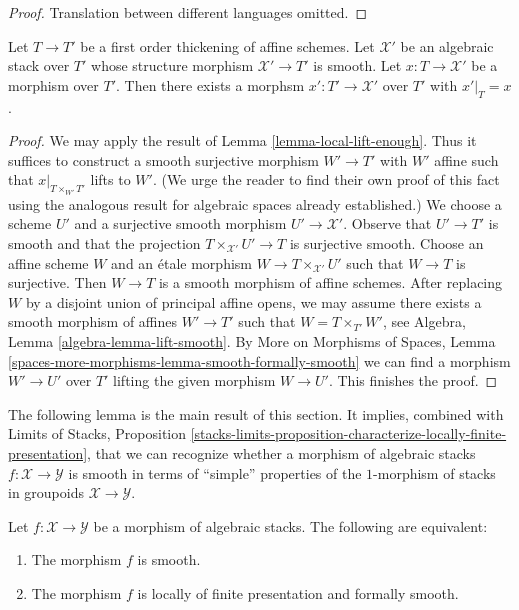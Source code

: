 \begin{proof}
Translation between different languages omitted.
\end{proof}

\begin{lemma}
\label{lemma-lift-to-smooth}
Let $T \to T'$ be a first order thickening of affine schemes.
Let $\mathcal{X}'$ be an algebraic stack over $T'$
whose structure morphism $\mathcal{X}' \to T'$ is smooth.
Let $x : T \to \mathcal{X}'$ be a morphism
over $T'$. Then there exists a morphsm $x' : T' \to \mathcal{X}'$
over $T'$ with $x'|_T = x$.
\end{lemma}

\begin{proof}
We may apply the result of Lemma \ref{lemma-local-lift-enough}.
Thus it suffices to construct a smooth surjective morphism
$W' \to T'$ with $W'$ affine such that
$x|_{T \times_{W'} T'}$ lifts to $W'$.
(We urge the reader to find their own proof of this fact
using the analogous result for algebraic spaces already
established.) We choose a
scheme $U'$ and a surjective smooth morphism $U' \to \mathcal{X}'$.
Observe that $U' \to T'$ is smooth and that the projection
$T \times_{\mathcal{X}'} U' \to T$ is surjective smooth.
Choose an affine scheme $W$ and an \'etale morphism
$W \to T \times_{\mathcal{X}'} U'$ such that $W \to T$
is surjective. Then $W \to T$ is a smooth morphism of
affine schemes. After replacing $W$ by a disjoint union of
principal affine opens, we may assume there exists a
smooth morphism of affines $W' \to T'$ such that
$W = T \times_{T'} W'$, see Algebra, Lemma \ref{algebra-lemma-lift-smooth}.
By More on Morphisms of Spaces, Lemma
\ref{spaces-more-morphisms-lemma-smooth-formally-smooth}
we can find a morphism $W' \to U'$ over $T'$ lifting
the given morphism $W \to U'$. This finishes the proof.
\end{proof}

\noindent
The following lemma is the main result of this section.
It implies, combined with
Limits of Stacks, Proposition
\ref{stacks-limits-proposition-characterize-locally-finite-presentation},
that we can recognize whether a morphism of algebraic stacks
$f : \mathcal{X} \to \mathcal{Y}$ is smooth in terms of
``simple'' properties of the $1$-morphism of stacks in groupoids
$\mathcal{X} \to \mathcal{Y}$.

\begin{lemma}
\label{lemma-smooth-formally-smooth}
Let $f : \mathcal{X} \to \mathcal{Y}$ be a morphism of algebraic stacks.
The following are equivalent:
\begin{enumerate}
\item The morphism $f$ is smooth.
\item The morphism $f$ is locally of finite presentation and
formally smooth.
\end{enumerate}
\end{lemma}

